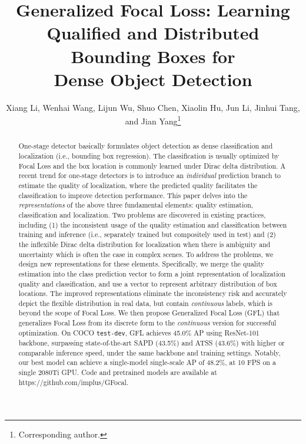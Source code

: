 \documentclass{article}
\title{Generalized Focal Loss: Learning Qualified and Distributed Bounding Boxes for \\ Dense Object Detection}
\author[]{Xiang Li, Wenhai Wang, Lijun Wu, Shuo Chen, Xiaolin Hu, Jun Li, Jinhui Tang, \\ and Jian Yang\thanks{Corresponding author.}}
\affil{PCALab, Nanjing University of Science and Technology  Momenta Nanjing University \\   Microsoft Research  Tsinghua University}
\affil{\scriptsize \{xiang.li.implus, shuochen, jinhuitang, csjyang\}@njust.edu.cn, wangwenhai362@163.com, \\ xlhu@mail.tsinghua.edu.cn, \{apeterswu,junl.mldl\}@gmail.com}
\begin{document}
\maketitle
\begin{abstract} 
  One-stage detector basically formulates object detection as dense classification and localization (i.e., bounding box regression). The classification is usually optimized by Focal Loss and the box location is commonly learned under Dirac delta distribution. A recent trend for one-stage detectors is to introduce an \emph{individual} prediction branch to estimate the quality of localization, where the predicted quality facilitates the classification to improve detection performance. This paper delves into the \emph{representations} of the above three fundamental elements: quality estimation, classification and localization. Two problems are discovered in existing practices, including (1) the inconsistent usage of the quality estimation and classification between training and inference (i.e., separately trained but compositely used in test) and (2) the inflexible Dirac delta distribution for localization when there is ambiguity and uncertainty which is often the case in complex scenes. To address the problems, we design new representations for these elements. Specifically, we merge the quality estimation into the class prediction vector to form a joint representation of localization quality and classification, and use a vector to represent arbitrary distribution of box locations. The improved representations eliminate the inconsistency risk and accurately depict the flexible distribution in real data, but contain \emph{continuous} labels, which is beyond the scope of Focal Loss. We then propose Generalized Focal Loss (GFL) that generalizes Focal Loss from its discrete form to the \emph{continuous} version for successful optimization. On COCO {\tt test-dev}, GFL achieves 45.0\% AP using ResNet-101 backbone, surpassing state-of-the-art SAPD (43.5\%) and ATSS (43.6\%) with higher or comparable inference speed, under the same backbone and training settings. Notably, our best model can achieve a single-model single-scale AP of 48.2\%, at 10 FPS on a single 2080Ti GPU. Code and pretrained models are available at https://github.com/implus/GFocal.
  








  


















\end{abstract}
\end{document}
